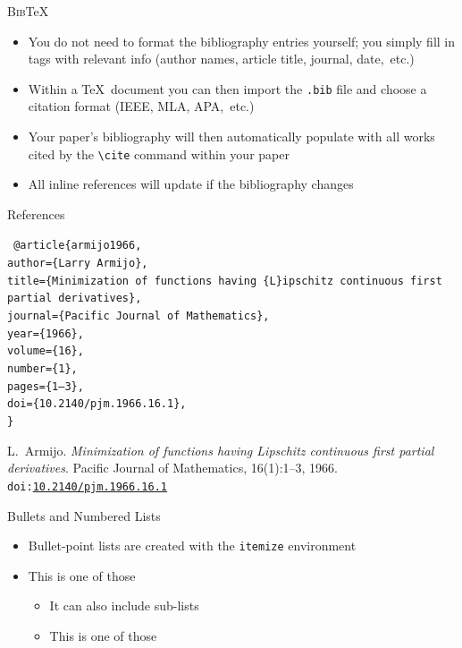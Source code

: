 \documentclass{beamer} %
\begin{document}
\begin{frame}{\textsc{Bib}\TeX}

\begin{itemize}
	\item You do not need to format the bibliography entries yourself; you simply fill in tags with relevant info (author names, article title, journal, date,~etc.)
	\item Within a \TeX\ document you can then import the \texttt{.bib} file and choose a citation format (IEEE, MLA, APA,~etc.)
	\item Your paper's bibliography will then automatically populate with all works cited by the \texttt{\textbackslash cite} command within your paper
	\item All inline references will update if the bibliography changes
\end{itemize}

\end{frame}

\begin{frame}{References}

{\tt \small
@article\{armijo1966,\\
author=\{Larry Armijo\},\\
title=\{Minimization of functions having \{L\}ipschitz continuous first partial derivatives\},\\
journal=\{Pacific Journal of Mathematics\},\\
year=\{1966\},\\
volume=\{16\},\\
number=\{1\},\\
pages=\{1--3\},\\
doi=\{10.2140/pjm.1966.16.1\},\\
\}
}

\vfill

L.~Armijo. \textit{Minimization of functions having Lipschitz continuous first partial derivatives}. Pacific Journal of Mathematics, 16(1):1--3, 1966. \texttt{doi:\href{https://doi.org/10.2140/pjm.1966.16.1}{10.2140/pjm.1966.16.1}}

\end{frame}

\begin{frame}{Bullets and Numbered Lists}

\begin{itemize}
	\item Bullet-point lists are created with the \texttt{itemize} environment
	\item This is one of those
	\begin{itemize}
		\item It can also include sub-lists
		\item This is one of those
	\end{itemize}
\end{itemize}

\end{frame}
\end{document}
